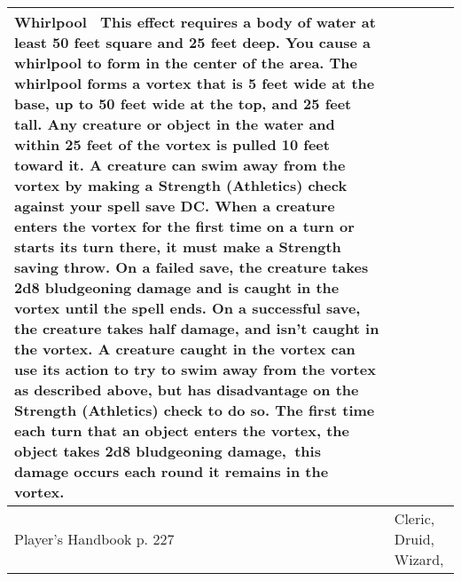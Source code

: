 \documentclass[11pt]{report}
\begin{document}
\begin{table}[H]
\begin{tabular}{||p{6cm}|p{6cm}||}
{Whirlpool 
This effect requires a body of water at least 50 feet square and 25 feet deep. You cause a whirlpool to form in the center of the area. The whirlpool forms a vortex that is 5 feet wide at the base, up to 50 feet wide at the top, and 25 feet tall. Any creature or object in the water and within 25 feet of the vortex is pulled 10 feet toward it. A creature can swim away from the vortex by making a Strength (Athletics) check against your spell save DC. 
When a creature enters the vortex for the first time on a turn or starts its turn there, it must make a Strength saving throw. On a failed save, the creature takes 2d8 bludgeoning damage and is caught in the vortex until the spell ends. On a successful save, the creature takes half damage, and isn’t caught in the vortex. A creature caught in the vortex can use its action to try to swim away from the vortex as described above, but has disadvantage on the Strength (Athletics) check to do so. 
The first time each turn that an object enters the vortex, the object takes 2d8 bludgeoning damage, this damage occurs each round it remains in the vortex.}\\ \hline
Player's Handbook p. 227 & Cleric, Druid, Wizard, \\ \hline\hline
	\end{tabular}
\end{table}
\end{document}

